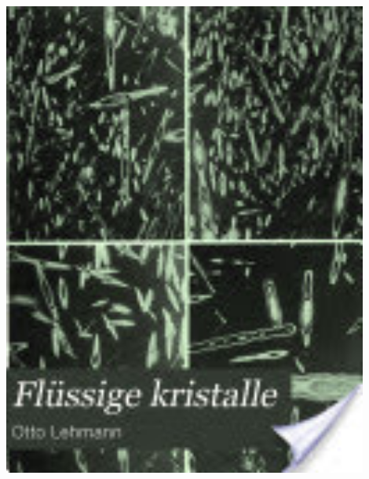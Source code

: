 \documentclass[14pt]{beamer}
\begin{document}
\begin{frame}
\begin{center}
\begin{columns}
\begin{column}{0.5\textwidth}
		\includegraphics[width=0.9\textwidth]{otto_lehmann_book.jpg}
			\end{column}
		\end{columns}
		\vspace*{1em}
	\end{center}
\end{frame}
\end{document}

